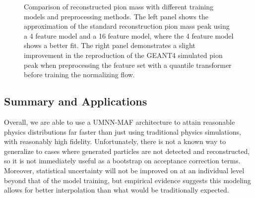         \begin{figure}[H]
            \centering
            \hfill
            \caption[Reconstructed Pion Mass Distributions]{Comparison of reconstructed pion mass with different training models and preprocessing methods. The left panel shows the approximation of the standard reconstruction pion mass peak using a 4 feature model and a 16 feature model, where the 4 feature model shows a better fit. The right panel demonstrates a slight improvement in the reproduction of the GEANT4 simulated pion peak when preprocessing the feature set with a quantile transformer before training the normalizing flow.}
            \label{fig:combined_pion_comparison}
        \end{figure}



\subsection{Summary and Applications}

 Overall, we are able to use a UMNN-MAF architecture to attain reasonable physics distributions far faster than just using traditional physics simulations, with reasonably high fidelity. Unfortunately, there is not a known way to generalize to cases where generated particles are not detected and reconstructed, so it is not immediately useful as a bootstrap on acceptance correction terms. Moreover, statistical uncertainty will not be improved on at an individual level beyond that of the model training, but empirical evidence \parencite{Radhakrishnan2020OverparameterizedMemory} suggests this modeling allows for better interpolation than what would be traditionally expected. 
 

